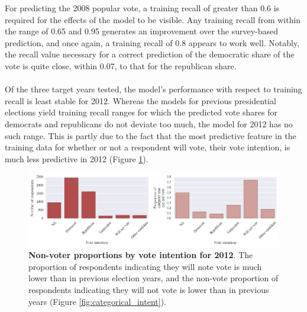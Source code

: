 \documentclass{article}
\begin{document}
	For predicting the 2008 popular vote, a training recall of greater than 0.6 is required for the effects of the model to be visible. Any training recall from within the range of 0.65 and 0.95 generates an improvement over the survey-based prediction, and once again, a training recall of 0.8 appears to work well. Notably, the recall value necessary for a correct prediction of the democratic share of the vote is quite close, within 0.07, to that for the republican share.
	\\\\
	Of the three target years tested, the model's performance with respect to training recall is least stable for 2012. Whereas the models for previous presidential elections yield training recall ranges for which the predicted vote shares for democrats and republicans do not deviate too much, the model for 2012 has no such range. This is partly due to the fact that the most predictive feature in the training data for whether or not a respondent will vote, their vote intention, is much less predictive in 2012 (Figure \ref{fig:categorical_intent_2012}).
	
	\begin{figure}[h!]
		\begin{center}
			\includegraphics*[width=1\linewidth]{categorical_intent_2012}
			\caption{\textbf{Non-voter proportions by vote intention for 2012}. The proportion of respondents indicating they will note vote is much lower than in previous election years, and the non-vote proportion of respondents indicating they will not vote is lower than in previous years (Figure \ref{fig:categorical_intent}).}
			\label{fig:categorical_intent_2012}
		\end{center}
	\end{figure}
\end{document}
